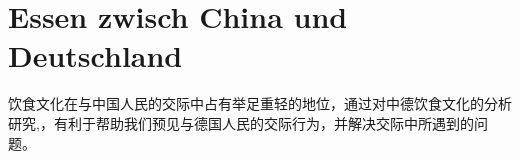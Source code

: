 \chapter{Essen zwisch China und Deutschland}


\cleardoubleemptypage
饮食文化在与中国人民的交际中占有举足重轻的地位，通过对中德饮食文化的分析研究,，有利于帮助我们预见与德国人民的交际行为，并解决交际中所遇到的问题。
